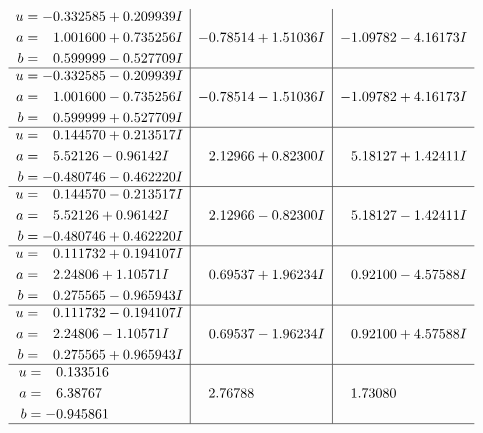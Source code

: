 \documentclass[1p]{elsarticle_modified}
\theoremstyle{definition}
\begin{document}
$$\begin{array}{c|c|c}
\begin{aligned}
u &= -0.332585 + 0.209939 I \\
a &= \phantom{-}1.001600 + 0.735256 I \\
b &= \phantom{-}0.599999 - 0.527709 I\end{aligned}
 & -0.78514 + 1.51036 I & -1.09782 - 4.16173 I \\ \hline\begin{aligned}
u &= -0.332585 - 0.209939 I \\
a &= \phantom{-}1.001600 - 0.735256 I \\
b &= \phantom{-}0.599999 + 0.527709 I\end{aligned}
 & -0.78514 - 1.51036 I & -1.09782 + 4.16173 I \\ \hline\begin{aligned}
u &= \phantom{-}0.144570 + 0.213517 I \\
a &= \phantom{-}5.52126 - 0.96142 I \\
b &= -0.480746 - 0.462220 I\end{aligned}
 & \phantom{-}2.12966 + 0.82300 I & \phantom{-}5.18127 + 1.42411 I \\ \hline\begin{aligned}
u &= \phantom{-}0.144570 - 0.213517 I \\
a &= \phantom{-}5.52126 + 0.96142 I \\
b &= -0.480746 + 0.462220 I\end{aligned}
 & \phantom{-}2.12966 - 0.82300 I & \phantom{-}5.18127 - 1.42411 I \\ \hline\begin{aligned}
u &= \phantom{-}0.111732 + 0.194107 I \\
a &= \phantom{-}2.24806 + 1.10571 I \\
b &= \phantom{-}0.275565 - 0.965943 I\end{aligned}
 & \phantom{-}0.69537 + 1.96234 I & \phantom{-}0.92100 - 4.57588 I \\ \hline\begin{aligned}
u &= \phantom{-}0.111732 - 0.194107 I \\
a &= \phantom{-}2.24806 - 1.10571 I \\
b &= \phantom{-}0.275565 + 0.965943 I\end{aligned}
 & \phantom{-}0.69537 - 1.96234 I & \phantom{-}0.92100 + 4.57588 I \\ \hline\begin{aligned}
u &= \phantom{-}0.133516\phantom{ +0.000000I} \\
a &= \phantom{-}6.38767\phantom{ +0.000000I} \\
b &= -0.945861\phantom{ +0.000000I}\end{aligned}
 & \phantom{-}2.76788\phantom{ +0.000000I} & \phantom{-}1.73080\phantom{ +0.000000I}\\
 \hline 
 \end{array}$$\newpage\newpage\renewcommand{\arraystretch}{1}
\end{document}
